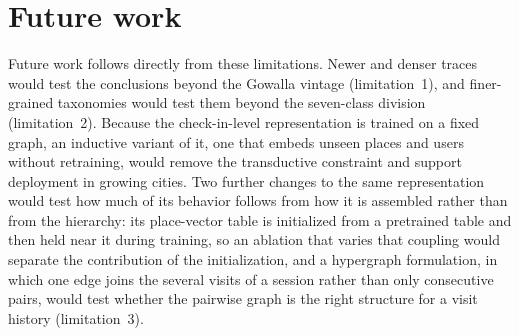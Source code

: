 \section{Future work}
\label{sec:conc:future}

Future work follows directly from these limitations. Newer and denser traces would
test the conclusions beyond the Gowalla vintage (limitation~1), and finer-grained
taxonomies would test them beyond the seven-class division (limitation~2). Because the
check-in-level representation is trained on a fixed graph, an inductive variant of it,
one that embeds unseen places and users without retraining, would remove the
transductive constraint and support deployment in growing cities. Two further changes to
the same representation would test how much of its behavior follows from how it is
assembled rather than from the hierarchy: its place-vector table is initialized from a
pretrained table and then held near it during training, so an ablation that varies that
coupling would separate the contribution of the initialization, and a hypergraph
formulation, in which one edge joins the several visits of a session rather than only
consecutive pairs, would test whether the pairwise graph is the right structure for a
visit history (limitation~3).
